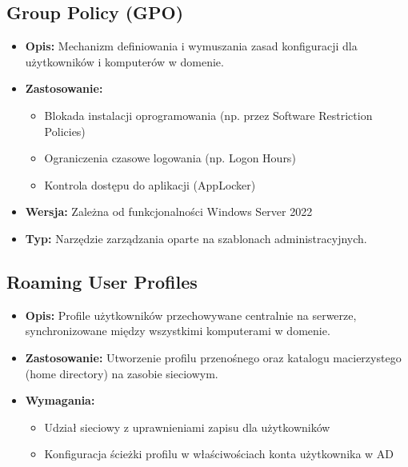\subsection{Group Policy (GPO)}
\begin{itemize}
\item \textbf{Opis:} Mechanizm definiowania i wymuszania zasad konfiguracji dla użytkowników i komputerów w domenie.
\item \textbf{Zastosowanie:}
\begin{itemize}
\item Blokada instalacji oprogramowania (np. przez Software Restriction Policies)
\item Ograniczenia czasowe logowania (np. Logon Hours)
\item Kontrola dostępu do aplikacji (AppLocker)
\end{itemize}
\item \textbf{Wersja:} Zależna od funkcjonalności Windows Server 2022
\item \textbf{Typ:} Narzędzie zarządzania oparte na szablonach administracyjnych.
\end{itemize}

\subsection{Roaming User Profiles}
\begin{itemize}
\item \textbf{Opis:} Profile użytkowników przechowywane centralnie na serwerze, synchronizowane między wszystkimi komputerami w domenie.
\item \textbf{Zastosowanie:} Utworzenie profilu przenośnego oraz katalogu macierzystego (home directory) na zasobie sieciowym.
\item \textbf{Wymagania:}
\begin{itemize}
\item Udział sieciowy z uprawnieniami zapisu dla użytkowników
\item Konfiguracja ścieżki profilu w właściwościach konta użytkownika w AD
\end{itemize}
\end{itemize}

